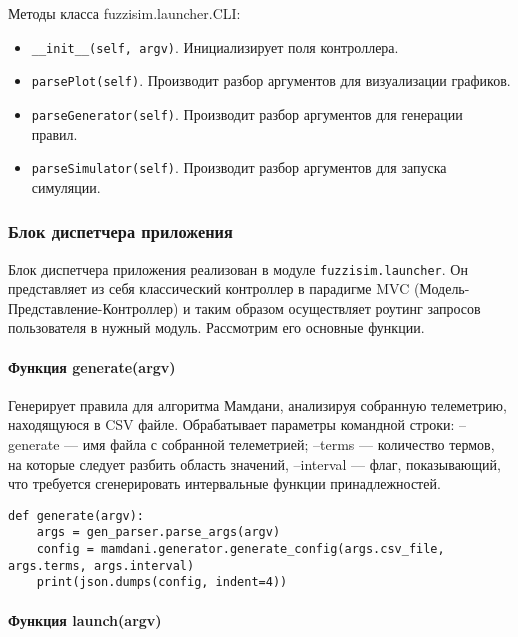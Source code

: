 Методы класса fuzzisim.launcher.CLI:
\begin{itemize}
	\item  \lstinline!__init__(self, argv)!. Инициализирует поля контроллера.
	\item  \lstinline!parsePlot(self)!.  Производит разбор аргументов для визуализации графиков.
	\item  \lstinline!parseGenerator(self)!.  Производит разбор аргументов для генерации правил.
	\item  \lstinline!parseSimulator(self)!.  Производит разбор аргументов для запуска симуляции.
\end{itemize}


\subsubsection{Блок диспетчера приложения }


Блок диспетчера приложения реализован в модуле \lstinline!fuzzisim.launcher!. Он представляет из себя классический контроллер в парадигме MVC (Модель-Представление-Контроллер) и таким образом осуществляет роутинг запросов пользователя в нужный модуль. Рассмотрим его основные функции.

\paragraph{Функция generate(argv)}

 Генерирует правила для алгоритма Мамдани, анализируя собранную телеметрию, находящуюся в CSV файле. Обрабатывает параметры командной строки: --generate — имя файла с собранной телеметрией; --terms —  количество термов, на которые следует разбить область значений, --interval — флаг, показывающий, что требуется сгенерировать интервальные функции принадлежностей.

\begin{lstlisting}[style=pythonstyle,caption={ }, label=lst:func:1]
  def generate(argv):
    args = gen_parser.parse_args(argv)
    config = mamdani.generator.generate_config(args.csv_file, args.terms, args.interval)
    print(json.dumps(config, indent=4))
\end{lstlisting}

\paragraph{Функция launch(argv)}

